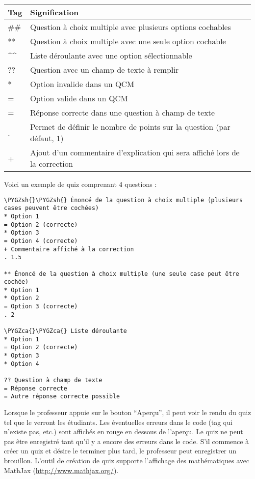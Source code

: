 \documentclass[letterpaper,10pt,french]{sphinxmanual}
\def\PYGZca{\char`\^}
\def\PYGZsh{\char`\#}
\begin{document}
\begin{tabulary}{\linewidth}{|L|L|}
\hline
\textsf{\relax 
Tag
} & \textsf{\relax 
Signification
}\\
\hline
\#\#
 & 
Question à choix multiple avec plusieurs options cochables
\\

**
 & 
Question à choix multiple avec une seule option cochable
\\

\textasciicircum{}\textasciicircum{}
 & 
Liste déroulante avec une option sélectionnable
\\

??
 & 
Question avec un champ de texte à remplir
\\

*
 & 
Option invalide dans un QCM
\\

=
 & 
Option valide dans un QCM
\\

=
 & 
Réponse correcte dans une question à champ de texte
\\

.
 & 
Permet de définir le nombre de points sur la question (par défaut, 1)
\\

+
 & 
Ajout d'un commentaire d'explication qui sera affiché lors de la correction
\\
\hline\end{tabulary}


Voici un exemple de quiz comprenant 4 questions :

\begin{Verbatim}[commandchars=\\\{\}]
\PYGZsh{}\PYGZsh{} Énoncé de la question à choix multiple (plusieurs cases peuvent être cochées)
* Option 1
= Option 2 (correcte)
* Option 3
= Option 4 (correcte)
+ Commentaire affiché à la correction
. 1.5

** Énoncé de la question à choix multiple (une seule case peut être cochée)
* Option 1
* Option 2
= Option 3 (correcte)
. 2

\PYGZca{}\PYGZca{} Liste déroulante
* Option 1
= Option 2 (correcte)
* Option 3
* Option 4

?? Question à champ de texte
= Réponse correcte
= Autre réponse correcte possible
\end{Verbatim}

Lorsque le professeur appuie sur le bouton ``Aperçu'', il peut voir le rendu du quiz tel que le verront les étudiants. Les éventuelles erreurs dans le code (tag qui n'existe pas, etc.) sont affichés en rouge en dessous de l'aperçu. Le quiz ne peut pas être enregistré tant qu'il y a encore des erreurs dans le code. S'il commence à créer un quiz et désire le terminer plus tard, le professeur peut enregistrer un brouillon. L'outil de création de quiz supporte l'affichage des mathématiques avec MathJax (\href{http://www.mathjax.org/}{http://www.mathjax.org/}).
\end{document}
